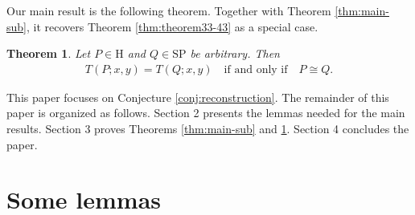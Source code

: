 \documentclass[11pt,a4paper]{article}
\newtheorem{theorem}{Theorem}[section]
\newtheorem{remark}{Remark}[section]
\begin{document}
Our main result is the following theorem. Together with Theorem \ref{thm:main-sub}, it recovers
Theorem \ref{thm:theorem33-43} as a special case.

\begin{theorem}\label{thm:main}
Let $P\in\mathrm H$ and $Q\in\mathrm{SP}$ be arbitrary. Then
\begin{eqnarray*}
T(P;x,y)=T(Q;x,y)\quad\text{if and only if}\quad P\cong Q.
\end{eqnarray*}
\end{theorem}


This paper focuses on Conjecture \ref{conj:reconstruction}.
The remainder of this paper is organized as follows.
Section 2 presents the lemmas needed for the main results.
Section 3 proves Theorems \ref{thm:main-sub} and \ref{thm:main}.
Section 4 concludes the paper.


\section{Some lemmas}
\end{document}
